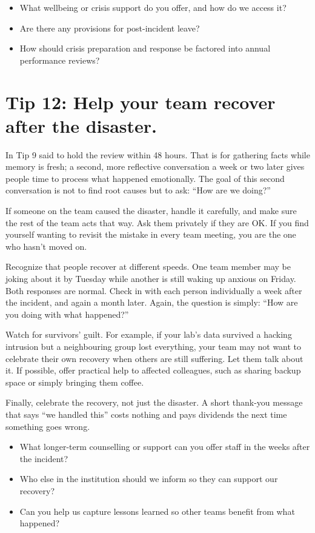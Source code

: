 \documentclass[10pt,letterpaper]{article}
\begin{document}
\begin{notebox}
  \begin{itemize}
  \item What wellbeing or crisis support do you offer, and how do we access it?
  \item Are there any provisions for post-incident leave?
  \item How should crisis preparation and response be factored into annual performance reviews?
  \end{itemize}
\end{notebox}

\section*{Tip 12: Help your team recover after the disaster.}

In Tip 9 said to hold the review within 48 hours. That is for gathering facts
while memory is fresh; a second, more reflective conversation a week or two
later gives people time to process what happened emotionally.  The goal of this
second conversation is not to find root causes but to ask: ``How are we doing?''

If someone on the team caused the disaster, handle it carefully, and make sure
the rest of the team acts that way.  Ask them privately if they are OK.  If you
find yourself wanting to revisit the mistake in every team meeting, you are the
one who hasn't moved on.

Recognize that people recover at different speeds.  One team member may be
joking about it by Tuesday while another is still waking up anxious on Friday.
Both responses are normal.  Check in with each person individually a week after
the incident, and again a month later.  Again, the question is simply: ``How are
you doing with what happened?''

Watch for survivors' guilt.  For example, if your lab's data survived a hacking
intrusion but a neighbouring group lost everything, your team may not want to
celebrate their own recovery when others are still suffering.  Let them talk
about it. If possible, offer practical help to affected colleagues, such as
sharing backup space or simply bringing them coffee.

Finally, celebrate the recovery, not just the disaster. A short thank-you
message that says ``we handled this'' costs nothing and pays dividends the next
time something goes wrong.

\begin{notebox}
  \begin{itemize}
  \item What longer-term counselling or support can you offer staff in the weeks after the incident?
  \item Who else in the institution should we inform so they can support our recovery?
  \item Can you help us capture lessons learned so other teams benefit from what happened?
  \end{itemize}
\end{notebox}

\nocite{*}

\end{document}
